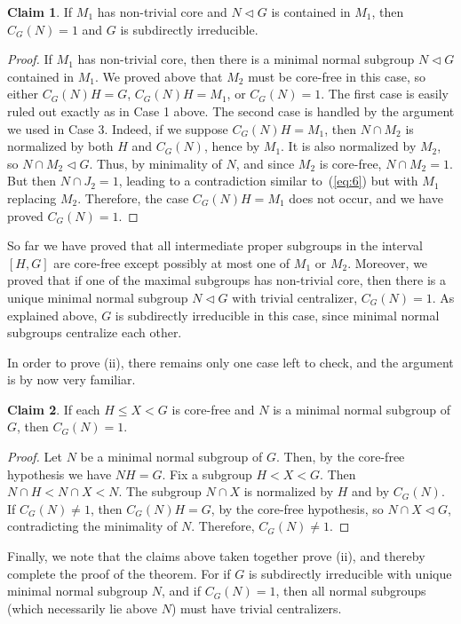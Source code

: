 \documentclass[cm,dissertation]{uhthesis}
\theoremstyle{plain}
\theoremstyle{definition}
\newcounter{claim}
\newtheorem{claim}[claim]{Claim}
\theoremstyle{remark}
\numberwithin{theorem}{section}
\numberwithin{claim}{chapter}
\numberwithin{equation}{section}
\numberwithin{conjecture}{chapter}
\newcommand{\<}{\ensuremath{\langle}}
\renewcommand{\>}{\ensuremath{\rangle}}
\renewcommand{\leq}{\ensuremath{\leqslant}}
\newcommand{\ssubnormal}{\ensuremath{\vartriangleleft}}
\newcommand{\0}{\ensuremath{\mathbf{0}}}
\newcommand{\1}{\ensuremath{\mathbf{1}}}
\newcommand{\2}{\ensuremath{\mathbf{2}}}
\newcommand{\3}{\ensuremath{\mathbf{3}}}
\newcommand{\4}{\ensuremath{\mathbf{4}}}
\newcommand{\5}{\ensuremath{\mathbf{5}}}
\begin{document}
\begin{claim}
If $M_1$ has non-trivial core
  and $N\ssubnormal G$ is contained in $M_1$, then
  $C_G(N)=1$ and $G$ is subdirectly irreducible.
\end{claim}
\begin{proof}
If $M_1$ has non-trivial core, then there is a minimal normal
subgroup $N\ssubnormal G$ contained in $M_1$.  We proved above that
$M_2$ must be core-free in this case, so either $C_G(N)H  = G$, 
$C_G(N)H  = M_1$, 
or $C_G(N)=1$.  The first case is easily ruled out exactly as in Case 1 above. 
The second case is handled by the argument we used in Case 3.  Indeed, if we suppose 
$C_G(N)H = M_1$, 
then 
$N\cap M_2$ 
is normalized by both $H$ and $C_G(N)$, hence by
$M_1$.  It is also normalized by $M_2$, so 
$N\cap M_2\ssubnormal G$.  Thus, by minimality of $N$, 
and since $M_2$ is core-free,
$N\cap M_2 = 1$.  But then $N\cap J_2 = 1$,
leading to a contradiction similar to~(\ref{eq:6}) but with $M_1$ replacing $M_2$.  
Therefore, the case 
$C_G(N)H = M_1$ does not occur, and we have proved $C_G(N)=1$. 
\end{proof}


So far we have proved that all intermediate proper subgroups in the interval $[H, G]$
are core-free except possibly at most one of $M_1$ or $M_2$.  Moreover, we
proved that if one of the maximal subgroups has non-trivial core, then there is
a unique minimal normal subgroup $N\ssubnormal G$ with trivial centralizer,
$C_G(N) = 1$.  As explained above, $G$ is subdirectly irreducible in this case,
since minimal normal subgroups centralize each other.

In order to prove (ii), there remains only one case left to check, and the
argument is by now very familiar.
\begin{claim}
  If each $H\leq X < G$ is core-free and $N$ is a minimal normal subgroup of
  $G$, then $C_G(N) = 1$.
\end{claim}
\begin{proof}
  Let $N$ be a minimal normal subgroup of $G$. Then, by the core-free hypothesis
  we have $NH = G$. Fix a subgroup $H< X < G$.  Then $N\cap H < N\cap X < N$.
  The subgroup $N\cap X$ is normalized by $H$ and by 
  $C_G(N)$.  If $C_G(N) \neq 1$, then $C_G(N)H = G$, by the core-free
  hypothesis, so $N\cap X\ssubnormal G$, contradicting the minimality of $N$.  
  Therefore, $C_G(N) \neq 1$.
\end{proof}
Finally, we note that the claims above taken together prove (ii), and thereby
complete the proof of the theorem.  For if $G$ is subdirectly irreducible with
unique minimal normal subgroup $N$, and if $C_G(N) = 1$, then all normal
subgroups (which necessarily lie above $N$) must have trivial centralizers. 
\end{document}
